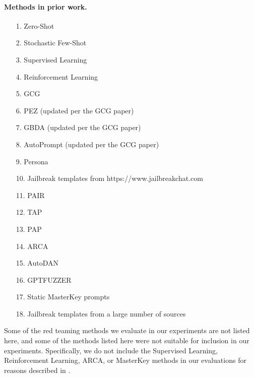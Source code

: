 \paragraph{Methods in prior work.}
\begin{enumerate}[leftmargin=*]
    \item[1.] Zero-Shot \citep{perez2022red}
    \item[2.] Stochastic Few-Shot \citep{perez2022red}
    \item[3.] Supervised Learning \citep{perez2022red}
    \item[4.] Reinforcement Learning \citep{perez2022red}
    \item[5.] GCG \citep{zou2023universal}
    \item[6.] PEZ \citep{wen2023hard} (updated per the GCG paper)
    \item[7.] GBDA \citep{guo-etal-2021-gradient} (updated per the GCG paper)
    \item[8.] AutoPrompt \citep{shin-etal-2020-autoprompt} (updated per the GCG paper)
    \item[9.] Persona \citep{shah2023scalable}
    \item[10.] Jailbreak templates from https://www.jailbreakchat.com \citep{liu2023jailbreaking}
    \item[11.] PAIR \citep{chao2023jailbreaking}
    \item[12.] TAP \citep{mehrotra2023treeOfAttacks}
    \item[13.] PAP \citep{zeng2024johnny}
    \item[14.] ARCA \citep{jones2023automatically}
    \item[15.] AutoDAN \citep{liu2023autodan}
    \item[16.] GPTFUZZER \citep{yu2023gptfuzzer}
    \item[17.] Static MasterKey prompts \citep{dengmasterkey}
    \item[18.] Jailbreak templates from a large number of sources \citep{shen2023anything}
\end{enumerate}

Some of the red teaming methods we evaluate in our experiments are not listed here, and some of the methods listed here were not suitable for inclusion in our experiments. Specifically, we do not include the Supervised Learning, Reinforcement Learning, ARCA, or MasterKey methods in our evaluations for reasons described in .

